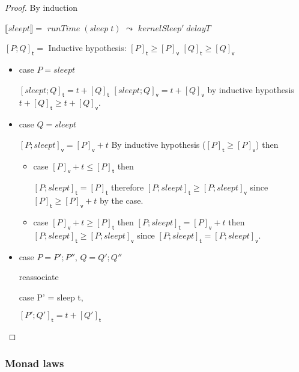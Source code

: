 \documentclass[preprint]{sigplanconf}
\newcommand{\Varid}[1]{\mathit{#1}}
\renewcommand{\leq}{\leqslant}
\renewcommand{\geq}{\geqslant}
\newcommand{\note}[1]{{\color{blue}{#1}}}
\theoremstyle{definition}
\newcommand{\vtime}[1]{[#1]_{\mathsf{v}}}
\newcommand{\etime}[1]{[#1]_{\mathsf{t}}}
\newcommand{\interp}[1]{\llbracket{#1}\rrbracket}
\begin{document}
\note{Rough notes for the proof}
\begin{proof}
By induction %

$\interp{sleep t} = $
\ensuremath{\Varid{runTime}\;(\Varid{sleep}\;\Varid{t})} $\leadsto$ \ensuremath{\Varid{kernelSleep'}\;\Varid{delayT}}

$\etime{P;Q} = $
Inductive hypothesis: $\etime{P} \geq \vtime{P}$
              $\etime{Q} \geq \vtime{Q}$


\begin{itemize}
\item case $P = sleep t$ 

$\etime{sleep t; Q} = t + \etime{Q}$ 
$\vtime{sleep t; Q} = t + \vtime{Q}$
by inductive hypothesis $t + \etime{Q} \geq t + \vtime{Q}$.

\item case $Q = sleep t$

$\vtime{P; sleep t} = \vtime{P} + t$
By inductive hypothesis ($\etime{P} \geq \vtime{P}$) then


\begin{itemize}
\item case $\vtime{P} + t \leq \etime{P}$ then

$\etime{P; sleep t} = \etime{P}$ 
therefore $\etime{P; sleep t} \geq \vtime{P; sleep t}$
since $\etime{P} \geq \vtime{P} + t$ by the case.

\item case $\vtime{P} + t \geq \etime{P}$ then
 $\etime{P; sleep t} = \vtime{P} + t$
then $\etime{P; sleep t} \geq \vtime{P; sleep t}$
since $\etime{P; sleep t} = \vtime{P; sleep t}$. 
\end{itemize}

\note{This is actually quite hard. I think I can do it
by using Lemma 1 and 2 together with some reassociating, but
haven't time to sort it right now.}

\item case $P = P';P''$, $Q = Q';Q''$

reassociate 

case P' = sleep t, 

$\etime{P';Q'} = t + \etime{Q'}$
\end{itemize}

\end{proof}

\subsubsection{Monad laws}
\end{document}
